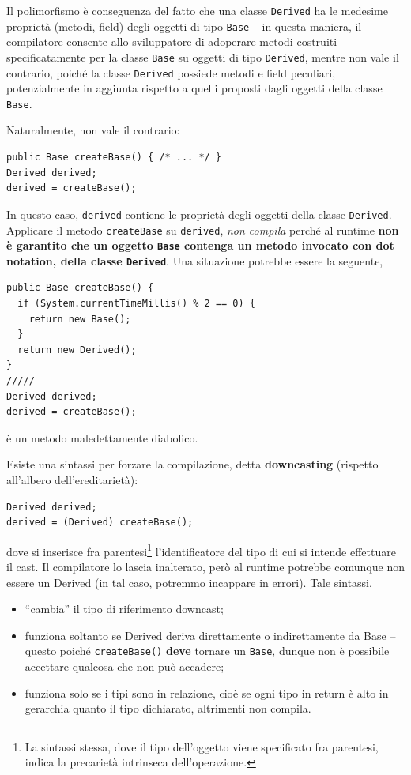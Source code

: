 \documentclass[\fontsizeclass,twocolumn]{\classname}
\theoremstyle{definition}
\theoremstyle{definition}
\begin{document}
Il polimorfismo è conseguenza del fatto che una classe \texttt{Derived} ha le
medesime proprietà (metodi, field) degli oggetti di tipo \texttt{Base} \--- in
questa maniera, il compilatore consente allo sviluppatore di adoperare metodi
costruiti specificatamente per la classe \texttt{Base} su oggetti di tipo
\texttt{Derived}, mentre non vale il contrario, poiché la classe
\texttt{Derived} possiede metodi e field peculiari, potenzialmente in aggiunta
rispetto a quelli proposti dagli oggetti della classe \texttt{Base}.

Naturalmente, non vale il contrario:

\begin{lstlisting}
public Base createBase() { /* ... */ }
Derived derived;
derived = createBase();
\end{lstlisting}

In questo caso, \texttt{derived} contiene le proprietà degli oggetti della
classe \texttt{Derived}. Applicare il metodo \texttt{createBase} su \texttt{derived},
\emph{non compila} perché al runtime \textbf{non è garantito che un oggetto \texttt{Base}
contenga un metodo invocato con dot notation, della classe \texttt{Derived}}. Una
situazione potrebbe essere la seguente,
\nopagebreak
\begin{lstlisting}
public Base createBase() {
  if (System.currentTimeMillis() % 2 == 0) {
    return new Base();
  }
  return new Derived();
}
/////
Derived derived;
derived = createBase();
\end{lstlisting}

è un metodo maledettamente diabolico.

Esiste una sintassi per forzare la compilazione, detta \textbf{downcasting}
(rispetto all'albero dell'ereditarietà):

\begin{lstlisting}
Derived derived;
derived = (Derived) createBase();
\end{lstlisting}

dove si inserisce fra parentesi\footnote{La sintassi stessa, dove il tipo
dell'oggetto viene specificato fra parentesi, indica la precarietà intrinseca
dell'operazione.} l'identificatore del tipo di cui si intende effettuare il
cast. Il compilatore lo lascia inalterato, però al runtime potrebbe comunque non
essere un Derived (in tal caso, potremmo incappare in errori). Tale sintassi,
\begin{itemize}
  \item ``cambia'' il tipo di riferimento downcast;
  \item funziona soltanto se Derived deriva direttamente o indirettamente da
      Base -- questo poiché \texttt{createBase()} \textbf{deve} tornare un
      \texttt{Base}, dunque non è possibile accettare qualcosa che non può
      accadere;
  \item funziona solo se i tipi sono in relazione, cioè se ogni tipo in return è
  alto in gerarchia quanto il tipo dichiarato, altrimenti non compila.
\end{itemize}
\end{document}
